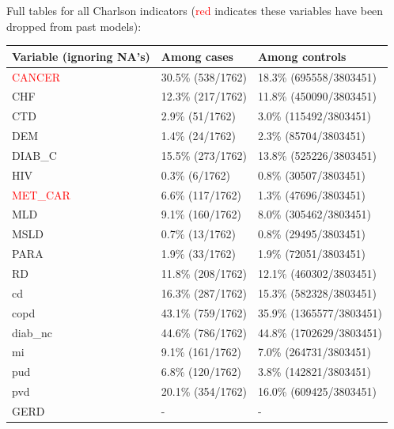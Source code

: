 \documentclass[12pt]{article}
\newcommand{\note}[1]{\textcolor{red}{#1}}
\begin{document}
\pagebreak

Full tables for all Charlson indicators (\note{red} indicates these variables have been dropped from past models):

\begin{center}
\begin{tabular}{|l|l|l|}
  \hline
Variable {\bf (ignoring NA's)} & Among cases & Among controls \\ \hline
\note{CANCER}                  & 30.5\% (538/1762)         & 18.3\% (695558/3803451)        \\ \hline
CHF                     & 12.3\% (217/1762)            & 11.8\% (450090/3803451)               \\ \hline
CTD                     & 2.9\% (51/1762)            & 3.0\% (115492/3803451)               \\ \hline
DEM                     & 1.4\% (24/1762)          & 2.3\% (85704/3803451)              \\ \hline
DIAB\_C                 & 15.5\% (273/1762)            &  13.8\% (525226/3803451)              \\ \hline
HIV                     & 0.3\% (6/1762)            & 0.8\% (30507/3803451)                \\ \hline
\note{MET\_CAR}                & 6.6\% (117/1762)            & 1.3\% (47696/3803451)               \\ \hline
MLD                     & 9.1\% (160/1762)            & 8.0\% (305462/3803451)               \\ \hline
MSLD                    & 0.7\% (13/1762)            & 0.8\% (29495/3803451)              \\ \hline
PARA                    & 1.9\% (33/1762)            & 1.9\% (72051/3803451)               \\ \hline
RD                      & 11.8\% (208/1762)            & 12.1\% (460302/3803451)               \\ \hline
cd                      & 16.3\% (287/1762)            & 15.3\% (582328/3803451)               \\ \hline
copd                    & 43.1\% (759/1762)             & 35.9\% (1365577/3803451)               \\ \hline
diab\_nc                & 44.6\% (786/1762)            & 44.8\% (1702629/3803451)               \\ \hline
mi                      & 9.1\% (161/1762)            & 7.0\% (264731/3803451)               \\ \hline
pud                     & 6.8\% (120/1762)            & 3.8\% (142821/3803451)               \\ \hline
pvd                     & 20.1\% (354/1762)             & 16.0\% (609425/3803451)               \\ \hline
GERD                    & -             & - \\ \hline
\end{tabular}


\end{center}
\end{document}
